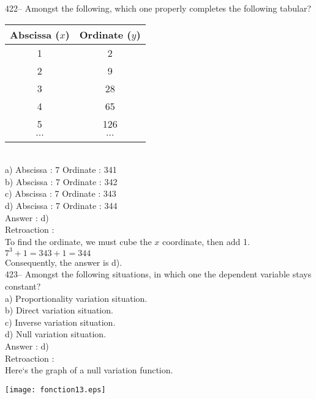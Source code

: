 ﻿\documentclass[letterpaper, 12pt]{article}
\begin{document}
422-- Amongst the following, which one properly completes the following tabular?\\
\begin{tabular}{|c|c|} \hline

{\bf Abscissa ($x$)} & {\bf Ordinate ($y$)}  \\ \hline \hline
1 & 2 \\ \hline
2 & 9 \\ \hline
3 & 28 \\ \hline
4 & 65 \\ \hline
5 & 126 \\ \hline
$\ldots$ & $\ldots$ \\ \hline
\multicolumn{2}{c}{}\\
\end{tabular}\\
a) Abscissa : 7 \qquad Ordinate : 341\\
b) Abscissa : 7 \qquad Ordinate : 342\\
c) Abscissa : 7 \qquad Ordinate : 343\\
d) Abscissa : 7 \qquad Ordinate : 344\\

Answer :  d)\\

Retroaction : \\
To find the ordinate, we must cube the $x$ coordinate,
then add 1.\\
$7^{3}+1=343+1=344$\\
Consequently, the answer is d).\\

423-- Amongst the following situations, in which one the dependent variable stays constant?\\
a) Proportionality variation situation.\\
b) Direct variation situation.\\
c) Inverse variation situation.\\
d) Null variation situation.\\

Answer :  d)\\

Retroaction : \\
Here`s the graph of a null variation function.\\
    \begin{center}
    \texttt{[image: fonction13.eps]}
    \end{center}
\end{document}
